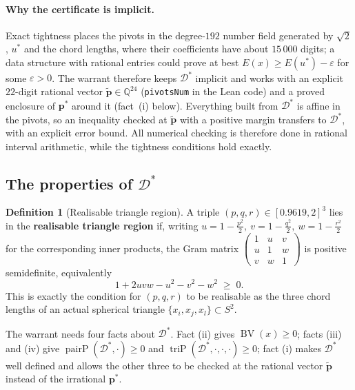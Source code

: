 \documentclass[11pt]{article}
\theoremstyle{definition}
\newtheorem{definition}[theorem]{Definition}
\theoremstyle{remark}
\newcommand{\QQ}{\mathbb{Q}}
\newcommand{\energy}{E}
\newcommand{\pairP}{\operatorname{pairP}}
\newcommand{\triP}{\operatorname{triP}}
\newcommand{\BV}{\operatorname{BV}}
\begin{document}
\paragraph{Why the certificate is implicit.} Exact tightness places the
pivots in the degree-$192$ number field generated by $\sqrt2$, $u^*$ and
the chord lengths, where their coefficients have about $15\,000$ digits;
a data structure with rational entries could prove at best
$\energy(x)\ge\energy(u^*)-\varepsilon$ for some $\varepsilon>0$. The
warrant therefore keeps $\mathcal{D}^*$ implicit and works with an explicit
$22$-digit rational vector
$\tilde{\mathbf{p}}\in\QQ^{24}$ (\texttt{pivotsNum} in the Lean code)
and a proved enclosure of $\mathbf{p}^*$
around it (fact~(i) below). Everything built from $\mathcal{D}^*$ is affine
in the pivots, so an inequality checked at $\tilde{\mathbf{p}}$ with a
positive margin transfers to $\mathcal{D}^*$, with an explicit error
bound. All numerical checking is therefore done in rational interval
arithmetic, while the tightness conditions hold exactly.

\subsection{The properties of \texorpdfstring{$\mathcal{D}^*$}{D*}}
\label{sec:method-four-facts}

\begin{definition}[Realisable triangle region]
A triple $(p,q,r)\in[0.9619,2]^3$ lies in the \textbf{realisable triangle
region} if, writing $u=1-\tfrac{p^2}2,\ v=1-\tfrac{q^2}2,\ w=1-\tfrac{r^2}2$
for the corresponding inner products, the Gram matrix
$\left(\begin{smallmatrix}1&u&v\\ u&1&w\\ v&w&1\end{smallmatrix}\right)$ is
positive semidefinite, equivalently
\begin{equation}
  1 + 2uvw - u^2 - v^2 - w^2 \;\ge\; 0.
\end{equation}
This is exactly the condition for $(p,q,r)$ to be realisable as the three
chord lengths of an actual spherical triangle $\{x_i,x_j,x_l\}\subset S^2$.
\end{definition}

The warrant needs four facts about $\mathcal{D}^*$. Fact (ii) gives
$\BV(x)\ge0$; facts (iii) and (iv) give $\pairP(\mathcal{D}^*,\cdot)\ge0$
and $\triP(\mathcal{D}^*,\cdot,\cdot,\cdot)\ge0$; fact (i) makes
$\mathcal{D}^*$ well defined and allows the other three to be checked at
the rational vector $\tilde{\mathbf{p}}$ instead of the irrational $\mathbf{p}^*$.
\end{document}
